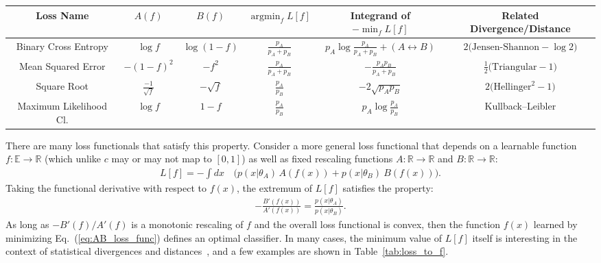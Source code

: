 \documentclass[aps,prx,reprint,preprintnumbers,superscriptaddress,nofootinbib,longbibliography,floatfix]{revtex4-2}
\DeclareMathOperator*{\argmin}{argmin}
\newcommand{\thetaup}{\theta_A}
\newcommand{\thetadown}{\theta_B}
\newcommand{\pup}{p_A}
\newcommand{\pdown}{p_B}
\DeclareRobustCommand{\Tab}[1]{Table~\ref{tab:#1}}
\DeclareRobustCommand{\Eq}[1]{Eq.~(\ref{eq:#1})}
\DeclareRobustCommand{\Ref}[1]{Ref.~\cite{#1}}
\begin{document}
\begin{table*}
    \centering
    \def\arraystretch{1.8}
    \begin{tabular}{c @{$\quad$} c @{$\quad$} c @{$\quad$} c @{$\quad$} c @{$\quad$} c }
    \hline\hline
       Loss Name & $A(f)$  & $B(f)$ & $\argmin_f L[f]$ &  Integrand of $- \min_f L[f]$ & Related Divergence/Distance  \\
       \hline
        Binary Cross Entropy & $\log f$ & $\log (1-f)$ & $\frac{\pup}{\pup+\pdown}$ & $\pup \log \frac{\pup}{\pup+\pdown} + (A \leftrightarrow B)$ & $2 \big( \text{Jensen-Shannon} - \log 2 \big)$ \\
       Mean Squared Error & $-(1-f)^2$ & $-f^2$ & $\frac{\pup}{\pup+\pdown}$ & $- \frac{\pup \pdown}{\pup+\pdown}$ & $\frac{1}{2} \big(\text{Triangular} - 1 \big)$  \\ 
       Square Root & $\frac{-1}{\sqrt{f}}$ & $-\sqrt{f}$ &  $\frac{\pup}{\pdown}$ & $-2 \sqrt{\pup \pdown}$ & $2\big(\text{Hellinger}^2 - 1 \big)$ \\
       Maximum Likelihood Cl. & $\log f$ & $1-f$ & $\frac{\pup}{\pdown}$ & $\pup \log \frac{\pup}{\pdown}$ & Kullback–Leibler\\
    \hline\hline
    \end{tabular}
    \caption{Examples of loss functionals in the form of \Eq{AB_loss_func}, with the associated location and value of the loss minimum, using the shorthand $p_i \equiv p(x|\theta_i)$.
    We have used the symbol $f$ in all cases to denote the classifier, but some choices require explicit constraints on $f$ to be either non-negative or in the range $[0,1]$.
    In the last column, we indicate the relation of the loss minimum to statistical divergences and distances, up to an overall scaling and offset.  See \Ref{2005math.....10521N} for additional relations.}
    \label{tab:loss_to_f}
\end{table*}


There are many loss functionals that satisfy this property.
%
Consider a more general loss functional that depends on a learnable function $f:\mathbb{E} \rightarrow \mathbb{R}$ (which unlike $c$ may or may not map to $[0,1]$) as well as fixed rescaling functions $A: \mathbb{R} \to \mathbb{R}$ and $B: \mathbb{R} \to \mathbb{R}$:
%
\begin{align}
\label{eq:AB_loss_func}
 L[f]  =-\int dx\, &\Big( p(x | \thetaup) \, A(f(x)) + p(x|\thetadown) \ B(f(x)) \Big).
\end{align}
%
Taking the functional derivative with respect to $f(x)$, the extremum of $L[f]$ satisfies the property:
%
\begin{align}
\label{eq:AB_learned_func}
- \frac{B'(f(x))}{A'(f(x))} = \frac{p(x|\thetaup)}{p(x|\thetadown)}.
\end{align}
%
As long as $-B'(f)/A'(f)$ is a monotonic rescaling of $f$ and the overall loss functional is convex, then the function $f(x)$ learned by minimizing \Eq{AB_loss_func} defines an optimal classifier.
%
In many cases, the minimum value of $L[f]$ itself is interesting in the context of statistical divergences and distances~\cite{2005math.....10521N}, and a few examples are shown in \Tab{loss_to_f}.
\end{document}

